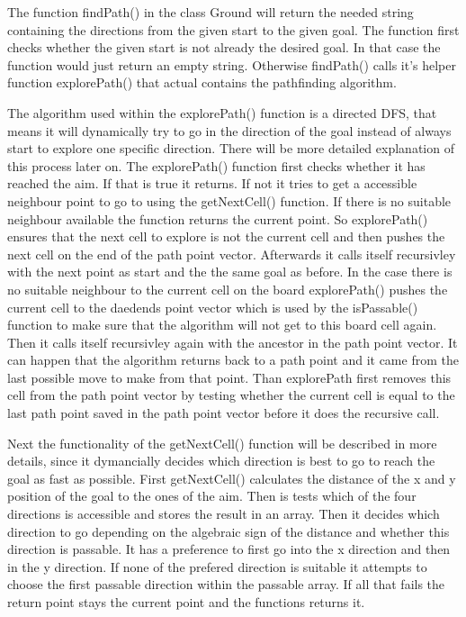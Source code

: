 \documentclass[a4paper,10pt]{article}
\begin{document}
	The function findPath() in the class Ground will return the needed string containing the directions from the given start to 		the given goal. The function first checks whether the given start is not already the desired goal. In that case the function 		would just return an empty string. Otherwise findPath() calls it's helper function explorePath() that actual contains the 		pathfinding algorithm.

	The algorithm used within the explorePath() function is a directed DFS, that means it will dynamically try to go in the 	direction of the goal instead of always start to explore one specific direction. There will be more detailed explanation of 		this process later on.
	The explorePath() function first checks whether it has reached the aim. If that is true it returns. If not it tries to get a 		accessible neighbour point to go to using the getNextCell() function. If there is no suitable neighbour available the 		function returns the current point. So explorePath() ensures that the next cell to explore is not the current cell and then 		pushes the next cell on the end of the path point vector. Afterwards it calls itself recursivley with the next point as start 		and the the same goal as before.
	In the case there is no suitable neighbour to the current cell on the board explorePath() pushes the current cell to the 		daedends point vector which is used by the isPassable() function to make sure that the algorithm will not get to this board 		cell again. Then it calls itself recursivley again with the ancestor in the path point vector. 
	It can happen that the algorithm returns back to a path point and it came from the last possible move to make from that 	point. Than explorePath first removes this cell from the path point vector by testing whether the current cell is equal to 		the last path point saved in the path point vector before it does the recursive call.

	Next the functionality of the getNextCell() function will be described in more details, since it dymancially decides which 		direction is best to go to reach the goal as fast as possible. First getNextCell() calculates the distance of the x and y 		position of the goal to the ones of the aim. Then is tests which of the four directions is accessible and stores the result 		in an array. Then it decides which direction to go depending on the algebraic sign of the distance and whether this direction 		is passable. It has a preference to first go into the x direction and then in the y direction. If none of the prefered 		direction is suitable it attempts to choose the first passable direction within the passable array. If all that fails the 		return point stays the current point and the functions returns it.
\end{document}
